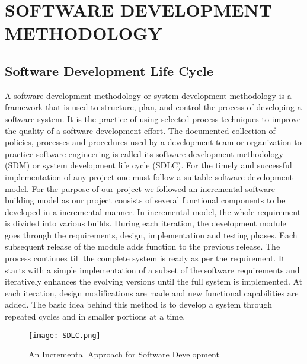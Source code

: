 

\section{SOFTWARE DEVELOPMENT METHODOLOGY}
\subsection{Software Development Life Cycle}
A software development methodology or system development methodology is a framework that is used to structure, plan, and control the process of developing a software system. It is the practice of using selected process techniques to improve the quality of a software development effort. The documented collection of policies, processes and procedures used by a development team or organization to practice software engineering is called its software development methodology (SDM) or system development life cycle (SDLC). For the timely and successful implementation of any project one must follow a suitable software development model. For the purpose of our project we followed an incremental software building model as our project consists of several functional components to be developed in a incremental manner. In incremental model, the whole requirement is divided into various builds. During each iteration, the development module goes through the requirements, design, implementation and testing phases. Each subsequent release of the module adds function to the previous release. The process continues till the complete system is ready as per the requirement. It starts with a simple implementation of a subset of the software requirements and iteratively enhances the evolving versions until the full system is implemented. At each iteration, design modifications are made and new functional capabilities are added. The basic idea behind this method is to develop a system through repeated cycles  and in smaller portions at a time.
\begin{figure}[h]
	\begin{center}
		
		\texttt{[image: SDLC.png]}
		\caption{An Incremental Approach for Software Development}
		\label{SDLC}
	\end{center}
\end{figure}

